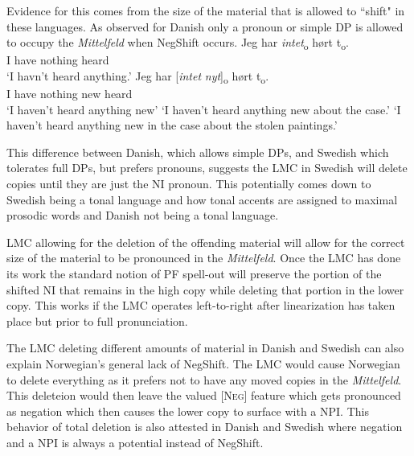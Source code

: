 \documentclass[12pt, letterpaper]{article}
\begin{document}
Evidence for this comes from the size of the material that is allowed to ``shift" in these languages. As observed for Danish only a pronoun or simple DP is allowed to occupy the \emph{Mittelfeld} when NegShift occurs. 
\ea 
	\ea 
		\gll Jeg har \textit{intet}\textsubscript{o} hørt t\textsubscript{o}.\\
		I have nothing heard\\
		\glt  `I havn't heard anything.'
	\ex 
		\gll Jeg har [\textit{intet} \textit{nyt}]\textsubscript{o} hørt t\textsubscript{o}.\\
		I have nothing new heard\\
		\glt `I haven't heard anything new'
		\glt `I haven't heard anything new about the case.'
		\glt `I haven't heard anything new in the case about the stolen paintings.'
	\z  	
\z 

This difference between Danish, which allows simple DPs, and Swedish which tolerates full DPs, but prefers pronouns, suggests the LMC in Swedish will delete copies until they are just the NI pronoun. This potentially comes down to Swedish being a tonal language and how tonal accents are assigned to maximal prosodic words \citep{myrbergProsodicWordSwedish2013,myrbergProsodicHierarchySwedish2015,riadPhonologySwedish2014} and Danish not being a tonal language.

LMC allowing for the deletion of the offending material will allow for the correct size of the material to be pronounced in the \emph{Mittelfeld}. Once the LMC has done its work the standard notion of PF spell-out will preserve the portion of the shifted NI that remains in the high copy while deleting that portion in the lower copy. This works if the LMC operates left-to-right after linearization has taken place but prior to full pronunciation. 

The LMC deleting different amounts of material in Danish and Swedish can also explain Norwegian's general lack of NegShift. The LMC would cause Norwegian to delete everything as it prefers not to have any moved copies in the \emph{Mittelfeld}. This deleteion would then leave the valued [\textsc{Neg}] feature which gets pronounced as negation which then causes the lower copy to surface with a NPI. This behavior of total deletion is also attested in Danish and Swedish where negation and a NPI is always a potential instead of NegShift.
\end{document}
